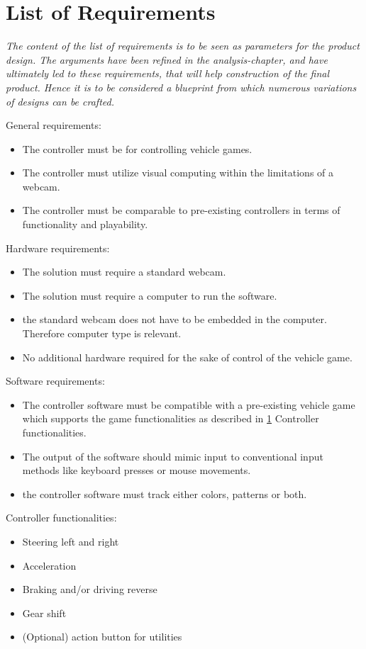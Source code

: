 \section{List of Requirements}
\label{LOR}

\textit{The content of the list of requirements is to be seen as parameters for the product design. The arguments have been refined in the analysis-chapter, and have ultimately led to these requirements, that will help construction of the final product. Hence it is to be considered a blueprint from which numerous variations of designs can be crafted.}
\bigskip

General requirements:
\begin{itemize}
\item The controller must be for controlling vehicle games.
\item The controller must utilize visual computing within the limitations of a webcam.
\item The controller must be comparable to pre-existing controllers in terms of functionality and playability.
\end{itemize}
Hardware requirements:
\begin{itemize}
\item The solution must require a standard webcam.
\item The solution must require a computer to run the software.
\item the standard webcam does not have to be embedded in the computer. Therefore computer type is relevant.
\item No additional hardware required for the sake of control of the vehicle game.
\end{itemize}
Software requirements:
\begin{itemize}
\item The controller software must be compatible with a pre-existing vehicle game which supports the game functionalities as described in \ref{LOR} Controller functionalities. 
\item The output of the software should mimic input to conventional input methods like keyboard presses or mouse movements.
\item the controller software must track either colors, patterns or both.
\end{itemize}
Controller functionalities:
\begin{itemize}
\item Steering left and right
\item Acceleration
\item Braking and/or driving reverse
\item Gear shift
\item (Optional) action button for utilities 
\end{itemize}